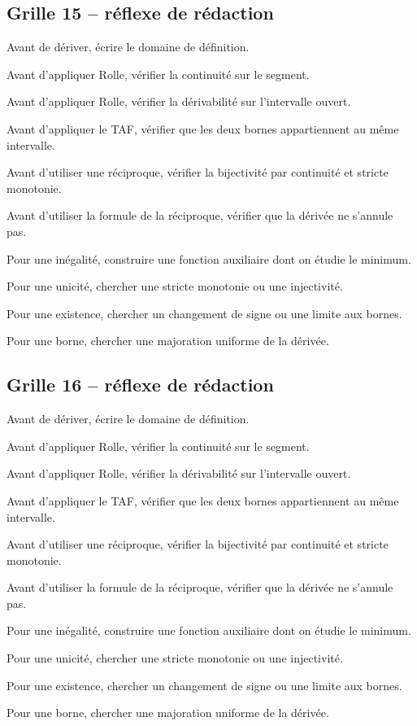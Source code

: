 \documentclass[11pt,a4paper]{article}
\begin{document}
\subsection*{Grille 15 -- réflexe de rédaction}

\begin{methodebox}

Avant de dériver, écrire le domaine de définition.

Avant d'appliquer Rolle, vérifier la continuité sur le segment.

Avant d'appliquer Rolle, vérifier la dérivabilité sur l'intervalle ouvert.

Avant d'appliquer le TAF, vérifier que les deux bornes appartiennent au même intervalle.

Avant d'utiliser une réciproque, vérifier la bijectivité par continuité et stricte monotonie.

Avant d'utiliser la formule de la réciproque, vérifier que la dérivée ne s'annule pas.

Pour une inégalité, construire une fonction auxiliaire dont on étudie le minimum.

Pour une unicité, chercher une stricte monotonie ou une injectivité.

Pour une existence, chercher un changement de signe ou une limite aux bornes.

Pour une borne, chercher une majoration uniforme de la dérivée.

\end{methodebox}

\subsection*{Grille 16 -- réflexe de rédaction}

\begin{methodebox}

Avant de dériver, écrire le domaine de définition.

Avant d'appliquer Rolle, vérifier la continuité sur le segment.

Avant d'appliquer Rolle, vérifier la dérivabilité sur l'intervalle ouvert.

Avant d'appliquer le TAF, vérifier que les deux bornes appartiennent au même intervalle.

Avant d'utiliser une réciproque, vérifier la bijectivité par continuité et stricte monotonie.

Avant d'utiliser la formule de la réciproque, vérifier que la dérivée ne s'annule pas.

Pour une inégalité, construire une fonction auxiliaire dont on étudie le minimum.

Pour une unicité, chercher une stricte monotonie ou une injectivité.

Pour une existence, chercher un changement de signe ou une limite aux bornes.

Pour une borne, chercher une majoration uniforme de la dérivée.

\end{methodebox}
\end{document}
